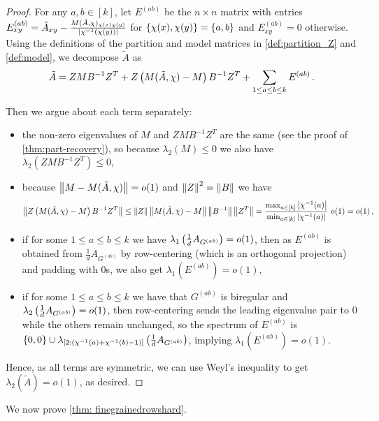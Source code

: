 \begin{proof}
    For any $a,b\in[k]$, let $E^{(ab)}$ be the $n\times n$ matrix with entries $E^{(ab)}_{xy}=\tilde{A}_{xy}-\frac{M(\tilde{A},\chi)_{\chi(x)\chi(y)}}{\left\lvert\chi^{-1}(\chi(y))\right\rvert}$ for $\left\{\chi(x), \chi(y)\right\}=\left\{a, b\right\}$ and $E^{(ab)}_{xy}=0$ otherwise.
    Using the definitions of the partition and model matrices in \cref{def:partition_Z} and \cref{def:model}, we decompose $\tilde{A}$ as
    $$\tilde{A}=ZMB^{-1}Z^T+Z\left(M(\tilde{A},\chi)-M\right)B^{-1}Z^T+\sum_{1\leq a\leq b\leq k} E^{(ab)}\,.$$

    Then we argue about each term separately:
    \begin{itemize}
        \item the non-zero eigenvalues of $M$ and $ZMB^{-1}Z^T$ are the same (see the proof of \cref{thm:part-recovery}), so because $\lambda_2(M)\leq 0$ we also have $\lambda_2(ZMB^{-1}Z^T)\leq 0$,
        \item because $\left\lVert M-M(\tilde{A},\chi)\right\rVert=o(1)$ and $\left\lVert Z\right\rVert^2=\left\lVert B\right\rVert$ we have
    $$\Norm{Z\Paren{M(\tilde{A},\chi)-M}B^{-1}Z^T}\leq \Norm{Z}\Norm{M(\tilde{A},\chi)-M}\Norm{B^{-1}}\Norm{Z^T}=\frac{\max_{a\in[k]}\Abs{\chi^{-1}(a)}}{\min_{a\in[k]}\Abs{\chi^{-1}(a)}}\ o(1)=o(1)\,,$$
        \item if for some $1\leq a \leq b\leq k$ we have $\lambda_1\left(\frac{1}{d}A_{G^{(ab)}}\right) = o(1)$, then as $E^{(ab)}$ is obtained from $\frac{1}{d}A_{G^{(ab)}}$ by row-centering (which is an orthogonal projection) and padding with $0$s, we also get $\lambda_1(E^{(ab)})=o(1)$,
        \item if for some $1\leq a \leq b\leq k$ we have that $G^{(ab)}$ is biregular and $\lambda_2\left(\frac{1}{d}A_{G^{(ab)}}\right) = o(1)$, then row-centering sends the leading eigenvalue pair to $0$ while the others remain unchanged, so the spectrum of $E^{(ab)}$ is $\left\{0, 0\right\}\cup \lambda_{\left[2\mathclose{:}\left(\chi^{-1}(a)+\chi^{-1}(b)-1\right)\right]}\left(\frac{1}{d}A_{G^{(ab)}}\right)$, implying $\lambda_1(E^{(ab)})=o(1)$.
    \end{itemize}
    Hence, as all terms are symmetric, we can use Weyl's inequality to get $\lambda_2(\tilde{A})=o(1)$, as desired.
\end{proof}

We now prove \cref{thm: finegrainedrowshard}.

